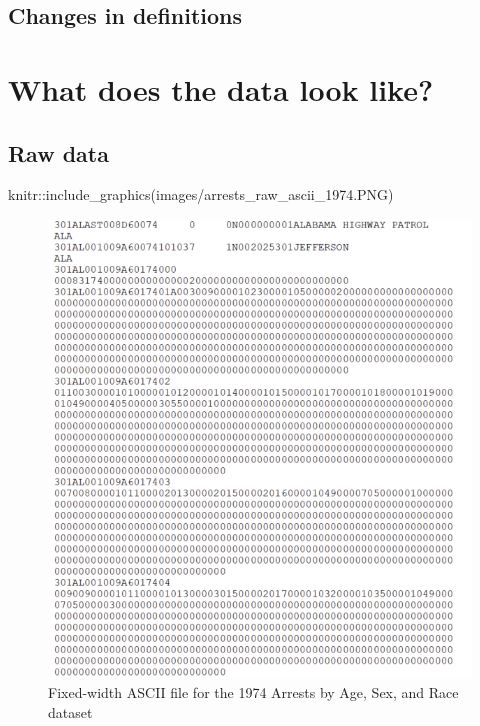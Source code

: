 \documentclass[
  12pt,
  openany]{book}
\newenvironment{Shaded}{\begin{snugshade}}{\end{snugshade}}
\newcommand{\FunctionTok}[1]{\textcolor[rgb]{0,0,0}{#1}}
\newcommand{\NormalTok}[1]{#1}
\newcommand{\SpecialCharTok}[1]{\textcolor[rgb]{0,0,0}{#1}}
\newcommand{\StringTok}[1]{\textcolor[rgb]{0.5,0.5,0.5}{#1}}
\begin{document}
\hypertarget{changes-in-definitions-1}{%
\subsection{Changes in definitions}\label{changes-in-definitions-1}}

\hypertarget{what-does-the-data-look-like-1}{%
\section{What does the data look like?}\label{what-does-the-data-look-like-1}}

\hypertarget{raw-data-1}{%
\subsection{Raw data}\label{raw-data-1}}

\begin{Shaded}
\begin{Highlighting}[]
\NormalTok{knitr}\SpecialCharTok{::}\FunctionTok{include\_graphics}\NormalTok{(}\StringTok{\textquotesingle{}images/arrests\_raw\_ascii\_1974.PNG\textquotesingle{}}\NormalTok{)}
\end{Highlighting}
\end{Shaded}

\begin{figure}
\includegraphics[width=8.43in]{images/arrests_raw_ascii_1974} \caption{Fixed-width ASCII file for the 1974 Arrests by Age, Sex, and Race dataset}\label{fig:unnamed-chunk-1}
\end{figure}
\end{document}
